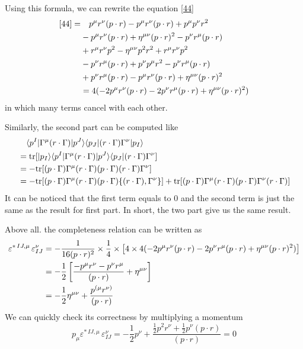 \documentclass[12pt]{article}
\newcommand{\aket}[1]{|#1\rangle}
\newcommand{\abra}[1]{\langle #1|}
\begin{document}
Using this formula, we can rewrite the equation \eqref{44}
\begin{align}
    \eqref{44}=&\quad p^\mu r^\nu (p\cdot r)-p^\mu r^\nu (p\cdot r)+p^\mu p^\nu r^2 \notag \\
    &-p^\mu r^\nu(p\cdot r)+\eta^{\mu\nu}(p\cdot r)^2-p^\nu r^\mu (p\cdot r)\notag \\
    &+r^\mu r^\nu p^2-\eta^{\mu\nu} p^2 r^2+r^\mu r^\nu p^2\notag \\
    &-p^\nu r^\mu (p\cdot r)+p^\nu p^\mu r^2 -p^\nu r^\mu (p\cdot r)\notag \\
    &+p^\nu r^\mu (p\cdot r)-p^\mu r^\nu (p\cdot r)+ \eta^{\mu\nu}(p\cdot r)^2\notag \\
    &=4(-2p^\mu r^\nu (p\cdot r)-2p^\nu r^\mu (p\cdot r)+\eta^{\mu\nu}(p\cdot r)^2)
\end{align}
in which many terms cancel with each other.

Similarly, the second part can be computed like
\begin{align}
    &\quad \abra{p^I}\Gamma^\mu(r\cdot \Gamma)\aket{p^J}\abra{p_J}(r\cdot \Gamma)\Gamma^\nu \aket{p_I}\notag \\
    &=\mathrm{tr}[\aket{p_I}\abra{p^I}\Gamma^\mu(r\cdot \Gamma)\aket{p^J}\abra{p_J}(r\cdot\Gamma)\Gamma^\nu]\notag\\
    &=-\mathrm{tr}[(p\cdot \Gamma)\Gamma^\mu(r\cdot \Gamma)(p\cdot \Gamma) (r\cdot \Gamma)\Gamma^\nu]\notag \\
    &=-\mathrm{tr}[(p\cdot \Gamma)\Gamma^\mu(r\cdot \Gamma)(p\cdot \Gamma) \{(r\cdot \Gamma),\Gamma^\nu\}]+\mathrm{tr}[(p\cdot \Gamma)\Gamma^\mu(r\cdot \Gamma)(p\cdot \Gamma)\Gamma^\nu (r\cdot \Gamma)]
\end{align}
It can be noticed that the first term  equals to 0 and the second term is just the same as the result for first part. In short, the two part give us the same result.

Above all. the completeness relation can be written as
\begin{align}
    \varepsilon^{*\,IJ,\mu}\,\varepsilon_{IJ}^{\nu}&=-\frac{1}{16(p\cdot r)^2}\times\frac{1}{4}\times \left[4\times4(-2p^\mu r^\nu (p\cdot r)-2p^\nu r^\mu (p\cdot r)+\eta^{\mu\nu}(p\cdot r)^2)\right]\notag \\
    &=-\frac{1}{2}\left[\frac{-p^\mu r^\nu-p^\nu r^\mu}{(p\cdot r)}+\eta^{\mu\nu}\right]\notag \\
    &=-\frac{1}{2}\eta^{\mu\nu}+\frac{p^{(\mu}r^{\nu)}}{(p\cdot r)}
\end{align}
We can quickly check its correctness by multiplying a momentum
\begin{equation}
    p_\mu\varepsilon^{*\,IJ,\mu}\,\varepsilon_{IJ}^{\nu}=-\frac{1}{2}p^\nu+\frac{\frac{1}{2}p^2 r^\nu+\frac{1}{2}p^\nu(p\cdot r) }{(p \cdot r)}=0
\end{equation}
\end{document}
